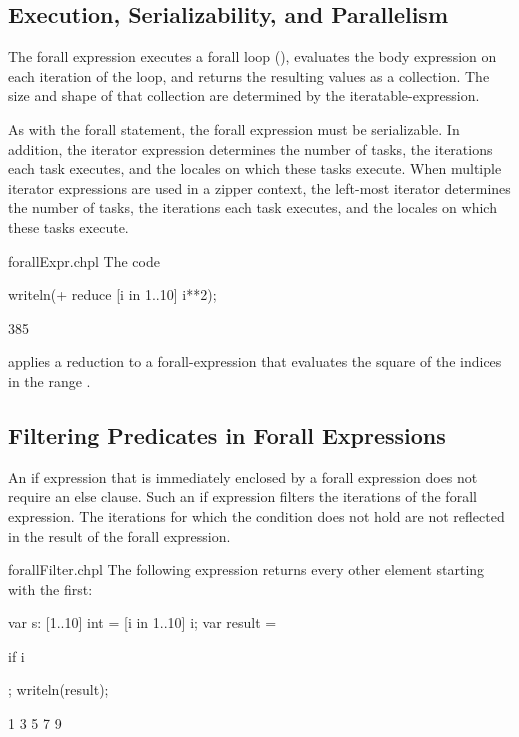 \subsection{Execution, Serializability, and Parallelism}

The forall expression executes a forall loop (),
evaluates the body expression on each iteration of the loop,
and returns the resulting values as a collection.
The size and shape of that collection
are determined by the iteratable-expression.

As with the forall statement, the forall expression must be
serializable.  In addition, the iterator expression determines the
number of tasks, the iterations each task executes, and the locales on
which these tasks execute.  When multiple iterator expressions are
used in a zipper context, the left-most iterator determines the number
of tasks, the iterations each task executes, and the locales on which
these tasks execute.

\begin{chapelexample}{forallExpr.chpl}
The code
\begin{chapel}
writeln(+ reduce [i in 1..10] i**2);
\end{chapel}
\begin{chapeloutput}
385
\end{chapeloutput}
applies a reduction to a forall-expression that evaluates the square
of the indices in the range .
\end{chapelexample}

\subsection{Filtering Predicates in Forall Expressions}
\label{Filtering_Predicates_Forall}

An if expression that is immediately enclosed by a forall expression
does not require an else clause. Such an if
expression filters the iterations of the forall expression.
The iterations for which the condition does not hold
are not reflected in the result of the forall expression.

\begin{chapelexample}{forallFilter.chpl}
The following expression returns every other element starting with the
first:
\begin{chapelpre}
var s: [1..10] int = [i in 1..10] i;
var result =
\end{chapelpre}
\begin{chapel}
[i in 1..s.numElements] if i %
\end{chapel}
\begin{chapelpost}
;
writeln(result);
\end{chapelpost}
\begin{chapeloutput}
1 3 5 7 9
\end{chapeloutput}
\end{chapelexample}


